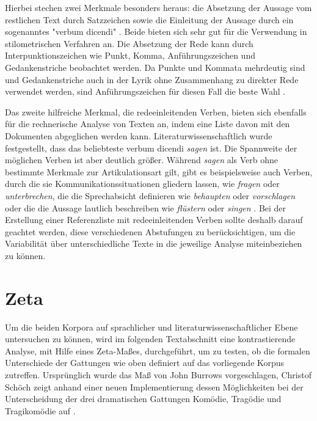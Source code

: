 \documentclass[a4paper,10p]{article}
\begin{document}
Hierbei stechen zwei Merkmale besonders heraus: die Absetzung der Aussage vom restlichen Text durch Satzzeichen sowie die Einleitung der Aussage durch ein sogenanntes "verbum dicendi" \citep[S. 6]{Bloss2005}. Beide bieten sich sehr gut für die Verwendung in stilometrischen Verfahren an. Die Absetzung der Rede kann durch Interpunktionszeichen wie Punkt, Komma, Anführungszeichen und Gedankenstriche beobachtet werden. Da Punkte und Kommata mehrdeutig sind und Gedankenstriche auch in der Lyrik ohne Zusammenhang zu direkter Rede verwendet werden, sind Anführungszeichen für diesen Fall die beste Wahl \citep[vgl.][S. 34]{Bloss2005}.\par 

Das zweite hilfreiche Merkmal, die redeeinleitenden Verben, bieten sich ebenfalls für die rechnerische Analyse von Texten an, indem eine Liste davon mit den Dokumenten abgeglichen werden kann. Literaturwissenschaftlich wurde festgestellt, dass das beliebteste verbum dicendi \textit{sagen} ist. Die Spannweite der möglichen Verben ist aber deutlich größer. Während \textit{sagen} als Verb ohne bestimmte Merkmale zur Artikulationsart gilt, gibt es beispielsweise auch Verben, durch die sie Kommunikationssituationen gliedern lassen, wie \textit{fragen} oder \textit{unterbrechen}, die die Sprechabsicht definieren wie \textit{behaupten} oder \textit{vorschlagen} oder die die Aussage lautlich beschreiben wie \textit{flüstern} oder \textit{singen} \citep[vgl.][S. 66-68]{Blossg2005}. Bei der Erstellung einer Referenzliste mit redeeinleitenden Verben sollte deshalb darauf geachtet werden, diese verschiedenen Abstufungen zu berücksichtigen, um die Variabilität über unterschiedliche Texte in die jeweilige Analyse miteinbeziehen zu können.


\section{Zeta}
Um die beiden Korpora auf sprachlicher und literaturwissenschaftlicher Ebene untersuchen zu können, wird im folgenden Textabschnitt eine kontrastierende Analyse, mit Hilfe eines Zeta-Maßes, durchgeführt, um zu testen, ob die formalen Unterschiede der Gattungen wie oben definiert auf das vorliegende Korpus zutreffen. Ursprünglich wurde das Maß von John Burrows vorgeschlagen, Christof Schöch zeigt anhand einer neuen Implementierung dessen Möglichkeiten bei der Unterscheidung der drei dramatischen Gattungen Komödie, Tragödie und Tragikomödie auf \citep[vgl.][S. 77 f.]{SchoechZeta}. \par 
\end{document}
